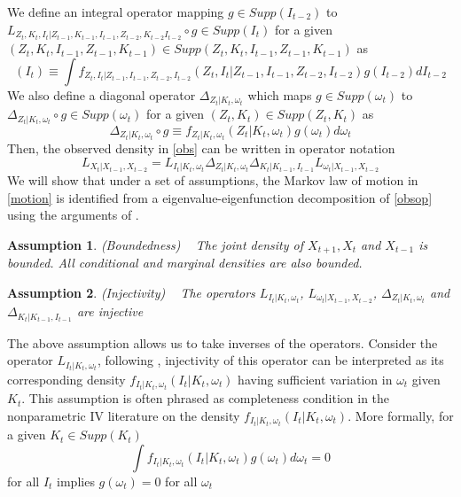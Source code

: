 \documentclass{article}
\newtheorem{assump}{Assumption}[section]
\begin{document}
We define an integral operator mapping $g\in Supp(I_{t-2})$ to $L_{Z_{t}, K_{t}, I_{t}|Z_{t-1}, K_{t-1}, I_{t-1}, Z_{t-2}, K_{t-2} I_{t-2}}\circ g \in Supp(I_{t})$ for a given $(Z_{t}, K_{t}, I_{t-1}, Z_{t-1}, K_{t-1})\in Supp(Z_{t}, K_{t}, I_{t-1}, Z_{t-1}, K_{t-1})$ as
\begin{equation*}
[L_{Z_{t}, K_{t}, I_{t}|Z_{t-1}, K_{t-1}, I_{t-1}, Z_{t-2}, K_{t-2}, I_{t-2}}\circ g](I_{t})\equiv\int f_{Z_{t}, I_{t}|Z_{t-1}, I_{t-1}, Z_{t-2}, I_{t-2}}(Z_{t}, I_{t}|Z_{t-1}, I_{t-1}, Z_{t-2}, I_{t-2})g(I_{t-2})dI_{t-2}
\end{equation*}
We also define a diagonal operator $\Delta_{Z_{t}|K_{t}, \omega_{t}}$ which maps $g\in Supp(\omega_{t})$ to $\Delta_{Z_{t}|K_{t}, \omega_{t}}\circ g\in Supp(\omega_{t})$ for a given $(Z_{t}, K_{t})\in Supp(Z_{t}, K_{t})$ as
\begin{equation*}
\Delta_{Z_{t}|K_{t}, \omega_{t}}\circ g\equiv f_{Z_{t}|K_{t}, \omega_{t}}(Z_{t}|K_{t}, \omega_{t})g(\omega_{t})d\omega_{t}
\end{equation*}
Then, the observed density in \eqref{obs} can be written in operator notation
\begin{equation} \label{obsop}
L_{X_{t}|X_{t-1}, X_{t-2}}=L_{I_{t}|K_{t}, \omega_{t}}\Delta_{Z_{t}|K_{t}, \omega_{t}}\Delta_{K_{t}|K_{t-1}, I_{t-1}}L_{\omega_{t}|X_{t-1}, X_{t-2}}
\end{equation}
We will show that under a set of assumptions, the Markov law of motion in \eqref{motion} is identified from a eigenvalue-eigenfunction decomposition of \eqref{obsop} using the arguments of \cite{Hu2008}.

\begin{assump} (Boundedness) \label{bounded}
~
The joint density of $X_{t+1}, X_{t}$ and $X_{t-1}$ is bounded. All conditional and marginal densities are also bounded.
\end{assump}

\begin{assump} (Injectivity) \label{injectivity}
~
The operators $L_{I_{t}|K_{t}, \omega_{t}}$, $L_{\omega_{t}|X_{t-1}, X_{t-2}}$, $\Delta_{Z_{t}|K_{t}, \omega_{t}}$ and $\Delta_{K_{t}|K_{t-1}, I_{t-1}}$ are injective
\end{assump}
The above assumption allows us to take inverses of the operators. Consider the operator $L_{I_{t}|K_{t}, \omega_{t}}$, following \cite{Hu2008}, injectivity of this operator can be interpreted as its corresponding density $f_{I_{t}|K_{t}, \omega_{t}}(I_{t}|K_{t}, \omega_{t})$ having sufficient variation in $\omega_{t}$ given $K_{t}$. This assumption is often phrased as completeness condition in the nonparametric IV literature on the density $f_{I_{t}|K_{t}, \omega_{t}}(I_{t}|K_{t}, \omega_{t})$. More formally, for a given $K_{t}\in Supp(K_{t})$
\begin{equation}
\int f_{I_{t}|K_{t}, \omega_{t}}(I_{t}|K_{t}, \omega_{t})g(\omega_{t})d\omega_{t}=0
\end{equation}
for all $I_{t}$ implies $g(\omega_{t})=0$ for all $\omega_{t}$\\
\end{document}
